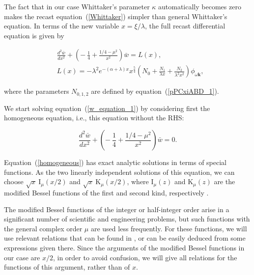 \documentclass[draft]{agujournal2019}
\renewcommand{\vec}{\mathbf}
\begin{document}
The fact that in our case Whittaker's parameter $\kappa$ automatically becomes
zero makes the recast equation~(\ref{Whittaker}) simpler than general Whittaker's
equation. In terms of the new variable $x=\xi/\lambda$, the full recast differential equation is given by
\begin{linenomath*}
\begin{subequations}
\label{w,L}%
\begin{align}
&  \frac{d^{2}\bar{w}}{dx^{2}}+\left(  -\ \frac{1}{4}+\frac{1/4-\mu^{2}%
}{x^{2}}\right)  \bar{w}=L\left(  x\right)  ,\label{w_equation_1}\\
&  L\left(  x\right)  =-\lambda^{2}e^{-\left(  \alpha+\lambda\right)
x}x^{\frac{5}{4}}\left(  N_{0}+\frac{N_{1}}{\lambda x}+\frac{N_{2}}%
{\lambda^{2}x^{2}}\right)  \phi_{\omega\vec{k}}, 
\label{L(x)}
\end{align}
\end{subequations}
\end{linenomath*}
where the parameters $N_{0,1,2}$ are defined by equation~(\ref{pPCxiABD_1}).

We start solving equation~(\ref{w_equation_1}) by considering 
first the homogeneous equation, i.e., this equation without the RHS:
\begin{linenomath*}
\begin{equation}
\frac{d^{2}\bar{w}}{dx^{2}}+\left(  -\ \frac{1}{4}+\frac{1/4-\mu^{2}}{x^{2}%
}\right)  \bar{w}=0. 
\label{homogeneous}
\end{equation}
\end{linenomath*}
Equation~(\ref{homogeneous}) has exact analytic solutions in terms of special functions. 
As the two linearly independent solutions of this equation, we can choose 
$\sqrt{x}\ \mathrm{I}_{\mu}(x/2)$ and $\sqrt{x}\ \mathrm{K}_{\mu}(x/2)$, where
$\mathrm{I}_{\mu}\left(  z\right)  $ and $\mathrm{K}_{\mu}\left(  z\right)  $
are the modified Bessel functions of the first and second kind, respectively
\cite{Bateman_Erdelyi:Higher3,Abramowitz:Handbook88,Arfken:Mathematical}.

The modified Bessel functions of the integer or half-integer order
\cite{Abramowitz:Handbook88} arise in a significant number of scientific and
engineering problems, but such functions with the general complex order $\mu$ are used less frequently. 
For these functions, we will use relevant relations that can be found in
, or can be easily deduced from some
expressions given there. Since the arguments of the modified Bessel functions in our
case are $x/2$, in order to avoid confusion, we will give all relations for
the functions of this argument, rather than of $x$.
\end{document}
